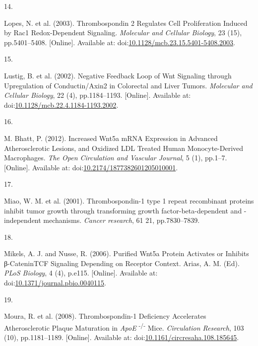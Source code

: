 \documentclass[
  11pt,
]{article}
\newlength{\cslhangindent}
\newlength{\csllabelwidth}
\newlength{\cslentryspacingunit} %
\newenvironment{CSLReferences}[2] %
 {%
  \setlength{\parindent}{0pt}
  \ifodd #1
  \let\oldpar\par
  \def\par{\hangindent=\cslhangindent\oldpar}
  \fi
  \setlength{\parskip}{#2\cslentryspacingunit}
 }%
 {}
\newcommand{\CSLLeftMargin}[1]{\parbox[t]{\csllabelwidth}{#1}}
\newcommand{\CSLRightInline}[1]{\parbox[t]{\linewidth - \csllabelwidth}{#1}\break}
\begin{document}
\begin{CSLReferences}{0}{0}
\leavevmode{}%
\CSLLeftMargin{14. }
\CSLRightInline{Lopes, N. {et al.} (2003). {Thrombospondin 2 Regulates Cell Proliferation Induced by Rac1 Redox-Dependent Signaling}. \emph{Molecular and Cellular Biology}, 23 (15), pp.5401--5408. {[}Online{]}. Available at: doi:\href{https://doi.org/10.1128/mcb.23.15.5401-5408.2003}{10.1128/mcb.23.15.5401-5408.2003}.}

\leavevmode{}%
\CSLLeftMargin{15. }
\CSLRightInline{Lustig, B. {et al.} (2002). {Negative Feedback Loop of Wnt Signaling through Upregulation of Conductin/Axin2 in Colorectal and Liver Tumors}. \emph{Molecular and Cellular Biology}, 22 (4), pp.1184--1193. {[}Online{]}. Available at: doi:\href{https://doi.org/10.1128/mcb.22.4.1184-1193.2002}{10.1128/mcb.22.4.1184-1193.2002}.}

\leavevmode{}%
\CSLLeftMargin{16. }
\CSLRightInline{M. Bhatt, P. (2012). {Increased Wnt5a mRNA Expression in Advanced Atherosclerotic Lesions, and Oxidized LDL Treated Human Monocyte-Derived Macrophages}. \emph{The Open Circulation and Vascular Journal}, 5 (1), pp.1--7. {[}Online{]}. Available at: doi:\href{https://doi.org/10.2174/1877382601205010001}{10.2174/1877382601205010001}.}

\leavevmode{}%
\CSLLeftMargin{17. }
\CSLRightInline{Miao, W. M. {et al.} (2001). {Thrombospondin-1 type 1 repeat recombinant proteins inhibit tumor growth through transforming growth factor-beta-dependent and -independent mechanisms.} \emph{Cancer research}, 61 21, pp.7830--7839.}

\leavevmode{}%
\CSLLeftMargin{18. }
\CSLRightInline{Mikels, A. J. and Nusse, R. (2006). {Purified Wnt5a Protein Activates or Inhibits β-Catenin{\textendash}TCF Signaling Depending on Receptor Context}. Arias, A. M. (Ed). \emph{PLoS Biology}, 4 (4), p.e115. {[}Online{]}. Available at: doi:\href{https://doi.org/10.1371/journal.pbio.0040115}{10.1371/journal.pbio.0040115}.}

\leavevmode{}%
\CSLLeftMargin{19. }
\CSLRightInline{Moura, R. {et al.} (2008). {Thrombospondin-1 Deficiency Accelerates Atherosclerotic Plaque Maturation in {\emph{ApoE}} {\textsuperscript{{-}/{-}}} Mice}. \emph{Circulation Research}, 103 (10), pp.1181--1189. {[}Online{]}. Available at: doi:\href{https://doi.org/10.1161/circresaha.108.185645}{10.1161/circresaha.108.185645}.}


\end{CSLReferences}
\end{document}
